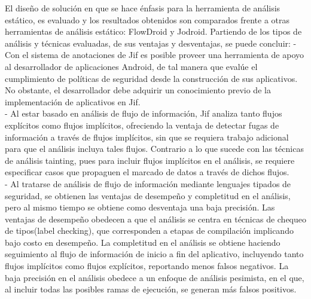 El diseño de solución en que se hace énfasis para la herramienta de análisis
estático, es evaluado y los resultados obtenidos son comparados frente a otras
herramientas de análisis estático: FlowDroid y Jodroid. Partiendo de los tipos
de análisis y técnicas evaluadas, de sus ventajas y desventajas, se
puede concluir:\newline 
- Con el sistema de anotaciones de Jif es posible proveer una herramienta de
apoyo al desarrollador de aplicaciones Android, de tal manera que evalúe el
cumplimiento de políticas de seguridad desde la construcción de sus aplicativos.\\
No obstante, el desarrollador debe adquirir un conocimiento previo de la
implementación de aplicativos en Jif.\\
- Al estar basado en análisis de flujo de información, Jif analiza tanto flujos
explícitos como flujos implícitos, ofreciendo la ventaja de detectar fugas de
información a través de flujos implícitos, sin que se requiera trabajo adicional
para que el análisis incluya tales flujos. Contrario a lo que sucede con las
técnicas de análisis tainting, pues para incluir flujos implícitos en el
análisis, se requiere especificar casos que propaguen el marcado de datos a
través de dichos flujos.\\
- Al tratarse de análisis de flujo de información mediante lenguajes tipados de
seguridad, se obtienen las ventajas de desempeño y completitud en el análisis,
pero al mismo tiempo se obtiene como desventaja una baja precisión.\newline 
Las ventajas de desempeño obedecen a que el análisis se centra en técnicas de
chequeo de tipos(label checking), que corresponden a etapas de compilación
implicando bajo costo en desempeño.\newline
La completitud en el análisis se obtiene  haciendo seguimiento al flujo de
información de inicio a fin del aplicativo\cite{LanguageIFS-2013}, incluyendo
tanto flujos implícitos como flujos explícitos, reportando menos falsos negativos.\newline
La baja precisión en el análisis obedece a un enfoque de análisis pesimista,
en el que, al incluir todas las posibles ramas de ejecución, se generan más
falsos positivos.\newline

